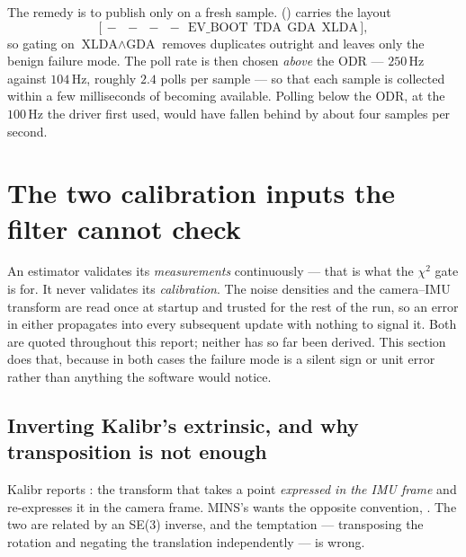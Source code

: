 The remedy is to publish only on a fresh sample. 
() carries the layout
\[
  \bigl[\,-\ \ -\ \ -\ \ -\ \ \text{EV\_BOOT}\ \ \text{TDA}\ \ \text{GDA}\ \ \text{XLDA}\,\bigr],
\]
so gating on $\text{XLDA} \wedge \text{GDA}$ removes duplicates outright and
leaves only the benign failure mode. The poll rate is then chosen
\emph{above} the ODR --- $250$\,Hz against $104$\,Hz, roughly $2.4$ polls
per sample --- so that each sample is collected within a few milliseconds
of becoming available. Polling below the ODR, at the $100$\,Hz the driver
first used, would have fallen behind by about four samples per second.

\section{The two calibration inputs the filter cannot check}
\label{sec:calibinputs}

An estimator validates its \emph{measurements} continuously --- that is what
the $\chi^2$ gate is for. It never validates its \emph{calibration}. The
noise densities and the camera--IMU transform are read once at startup and
trusted for the rest of the run, so an error in either propagates into every
subsequent update with nothing to signal it. Both are quoted throughout this
report; neither has so far been derived. This section does that, because in
both cases the failure mode is a silent sign or unit error rather than
anything the software would notice.

\subsection{Inverting Kalibr's extrinsic, and why transposition is not enough}
\label{sec:seinv}

Kalibr reports : the transform that takes a point
\emph{expressed in the IMU frame} and re-expresses it in the camera frame.
MINS's  wants the opposite convention,
. The two are related by an SE(3) inverse, and the
temptation --- transposing the rotation and negating the translation
independently --- is wrong.

